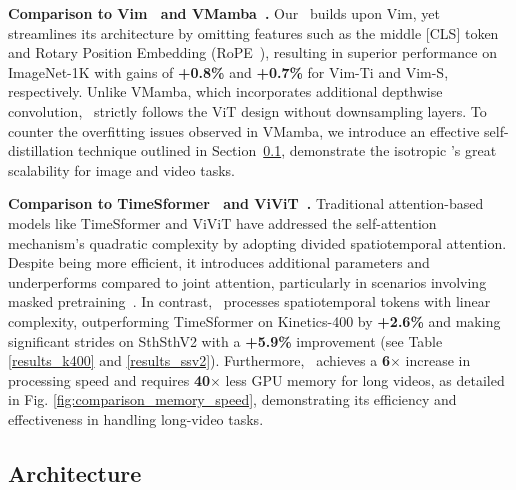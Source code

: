 \vspace{0.05cm}
\noindent\textbf{Comparison to Vim~\cite{vim} and VMamba~\cite{vmamba}.}
Our \ModelName\  builds upon Vim, 
yet streamlines its architecture by omitting features such as the middle [CLS] token and Rotary Position Embedding (RoPE~\cite{rope}), 
resulting in superior performance on ImageNet-1K with gains of \textbf{+0.8\%} and \textbf{+0.7\%} for Vim-Ti and Vim-S, respectively.
Unlike VMamba, 
which incorporates additional depthwise convolution, 
\ModelName\  strictly follows the ViT design without downsampling layers. 
To counter the overfitting issues observed in VMamba, 
we introduce an effective self-distillation technique outlined in Section~\ref{sec:arch},
demonstrate the isotropic \ModelName's great scalability for image and video tasks.


\vspace{0.05cm}
\noindent\textbf{Comparison to TimeSformer~\cite{timesformer} and ViViT~\cite{vivit}.}
Traditional attention-based models like TimeSformer and ViViT have addressed the self-attention mechanism's quadratic complexity by adopting divided spatiotemporal attention.
Despite being more efficient, 
it introduces additional parameters and underperforms compared to joint attention, 
particularly in scenarios involving masked pretraining~\cite{videomae,umt}. 
In contrast, 
\ModelName\  processes spatiotemporal tokens with linear complexity, 
outperforming TimeSformer on Kinetics-400 by \textbf{+2.6\%} and making significant strides on SthSthV2 with a \textbf{+5.9\%} improvement (see Table \ref{results_k400} and \ref{results_ssv2}). 
Furthermore, 
\ModelName\  achieves a \textbf{6$\times$} increase in processing speed and requires \textbf{40$\times$} less GPU memory for long videos, 
as detailed in Fig. \ref{fig:comparison_memory_speed}, 
demonstrating its efficiency and effectiveness in handling long-video tasks.


\subsection{Architecture}
\label{sec:arch}


